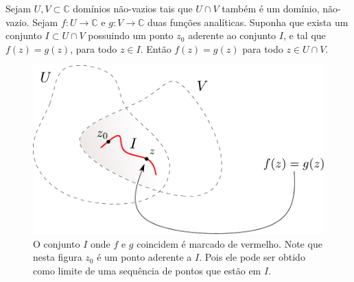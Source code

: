 \bigskip 


\begin{teorema}
\label{teo-principio-identidade}
Sejam $U,V\subset \mathbb{C}$ domínios não-vazios tais que $U\cap V$ também é um domínio,
não-vazio. Sejam $f:U\to\mathbb{C}$ e $g:V\to\mathbb{C}$ duas funções analíticas. Suponha que
exista um conjunto $I\subset U\cap V$ possuindo um ponto $z_0$ aderente ao conjunto $I$, e 
tal que $f(z)=g(z)$, para todo $z\in I$. 
Então $f(z)=g(z)$ para todo $z\in U\cap V$.
\end{teorema}

\begin{figure}[H]
\centering
\includegraphics[width=0.65\linewidth]{Figuras/zeros-isolados4}
\caption{O conjunto $I$ onde $f$ e $g$ coincidem é marcado de vermelho. Note que nesta figura $z_0$ é um ponto aderente a $I$. Pois ele pode ser obtido como limite de uma
sequência de pontos que estão em $I$.}
\label{fig:zeros-isolados4}
\end{figure}



